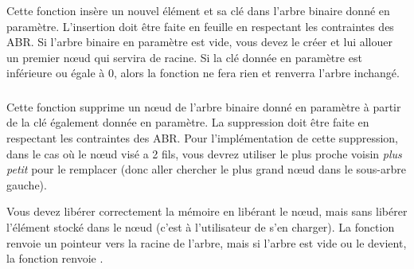 \subsubsection*{}

\noindent Cette fonction insère un nouvel élément et sa clé dans l'arbre binaire donné en paramètre.
L'insertion doit être faite en feuille en respectant les contraintes des ABR.
Si l'arbre binaire en paramètre est vide, vous devez le créer et lui allouer un premier nœud qui servira de racine.
Si la clé donnée en paramètre est inférieure ou égale à $ 0 $, alors la fonction ne fera rien et renverra l'arbre inchangé.

\bigskip


\subsubsection*{}

\noindent Cette fonction supprime un nœud de l'arbre binaire donné en paramètre à partir de la clé également donnée en paramètre.
La suppression doit être faite en respectant les contraintes des ABR.
Pour l'implémentation de cette suppression, dans le cas où le nœud visé a 2 fils, vous devrez utiliser le plus proche voisin \textit{plus petit} pour le remplacer (donc aller chercher le plus grand nœud dans le sous-arbre gauche).

\noindent Vous devez libérer correctement la mémoire en libérant le nœud, mais sans libérer l'élément stocké dans le nœud (c'est à l'utilisateur de s'en charger).
La fonction renvoie un pointeur vers la racine de l'arbre, mais si l'arbre est vide ou le devient, la fonction renvoie .

\medskip


\subsubsection*{}


